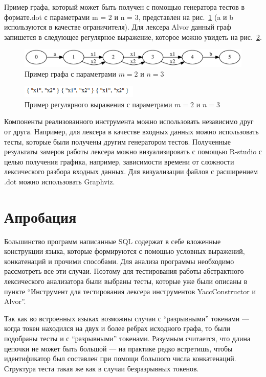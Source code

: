 Пример  графа, который может быть получен с помощью генератора тестов в формате.dot с параметрами m = 2 и n = 3, представлен на рис.~\ref{fig:m2_n3} 
(a и b используются в качестве ограничителя). Для лексера Alvor данный граф запишется в следующее регулярное выражение, которое можно увидеть 
на рис.~\ref{fig:m2_n3_alvor}. 
 
\begin{figure}[t]
\centering
\includegraphics[width=\textwidth]{Polubelova/m2_n3}
\caption{Пример графа с параметрами $m = 2$ и $n = 3$}
\label{fig:m2_n3} 
\end{figure}

\begin{figure}[t]
\centering
\includegraphics[width=0.5\textwidth]{Polubelova/m2_n3_alvor}
\caption{Пример регулярного выражения с параметрами $m = 2$ и $n = 3$}
\label{fig:m2_n3_alvor} 
\end{figure}

Компоненты реализованного инструмента можно использовать независимо друг от друга. Например, для лексера в качестве входных данных можно использовать тесты, 
которые были получены другим генератором тестов.  Полученные результаты замеров работы лексера можно визуализировать с помощью R-studio с целью получения графика, 
например, зависимости времени от сложности лексического разбора входных данных. Для визуализации файлов с расширением .dot можно использовать Graphviz.


\section{Апробация}
Большинство  программ написанные  SQL содержат в себе вложенные конструкции языка, которые формируются с помощью условных выражений, конкатенаций и прочими способами. 
Для анализа программы необходимо рассмотреть все эти случаи. Поэтому для тестирования работы абстрактного лексического анализатора были выбраны тесты, которые 
уже были описаны в пункте ``Инструмент для тестирования лексера инструментов YaccConstructor и Alvor''.

Так как во встроенных языках возможны случаи с “разрывными” токенами --- когда токен находился на двух и более ребрах исходного графа, то были подобраны тесты и 
с ``разрывными'' токенами. Разумным считается, что длина цепочки не может быть большой --- на практике редко встретишь, чтобы идентификатор был составлен при помощи
большого числа конкатенаций. Структура теста такая же как в случаи безразрывных токенов. 

